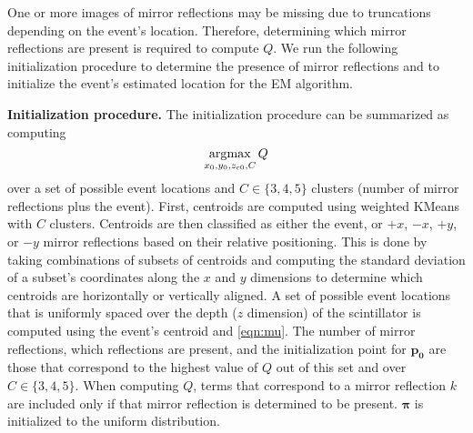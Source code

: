 One or more images of mirror reflections may be missing due to truncations 
depending on the event's location.
Therefore, determining which mirror reflections are present is required to compute $Q$.
We run the following initialization procedure to determine the presence of mirror 
reflections and to initialize the event's estimated location for the EM algorithm.

\noindent
\textbf{Initialization procedure.}
The initialization procedure can be summarized as computing 
\begin{equation}
\operatorname*{\arg\!\max}_{x_0,y_0,z_{c0},C} Q
\end{equation}
over a set of possible event locations and $C \in \{3,4,5\}$ clusters 
(number of mirror reflections plus the event).
First, centroids are computed using weighted KMeans with $C$ clusters.
Centroids are then classified as either the event, or $+x$, $-x$, $+y$, or $-y$ 
mirror reflections based on their relative positioning.
This is done by taking combinations of subsets of centroids and computing the 
standard deviation of a subset's coordinates along the $x$ and $y$ dimensions to 
determine which centroids are horizontally or vertically aligned.
A set of possible event locations that is uniformly spaced over the depth 
($z$ dimension) of the scintillator is computed using the event's centroid and \cref{eqn:mu}.
The number of mirror reflections, which reflections are present, and the 
initialization point for $\bm{p_0}$ are those that correspond to the 
highest value of $Q$ out of this set and over $C \in \{3, 4, 5\}$.
When computing $Q$, terms that correspond to a mirror reflection $k$ are included
only if that mirror reflection is determined to be present.
$\bm{\pi}$ is initialized to the uniform distribution.
\iffalse
This initialization procedure is described in \cref{alg:init}.
$\bm{\pi}$ is initialized to the uniform distribution.


\begin{algorithm}
\caption{\textbf{Initialization procedure.}} \label{alg:init}
\DontPrintSemicolon
\SetKwInOut{Parameter}{Arguments}
\SetKwFunction{KMeans}{KMeans}
\SetKwFunction{ClassifyCentroids}{ClassifyCentroids}
\SetKwFunction{PossibleEventLocations}{PossibleEventLocations}
\SetKwFunction{Q}{Q}
\SetKwComment{Comment}{// }{}
\Parameter{photon locations $\bm{t}$, photon weights $\bm{w}$, lens to sensor distance $S_2$}
\KwOut{event initialization location $\bm{p_{init}}$, number of mirror reflections $K_{out}$, mirror reflection classification $M_{out}$}
$Q_{max} = -\infty$\;
\For{K=3:5}{
  $\bm{\mu_k}^0 \leftarrow \KMeans(\bm{t}, \bm{w}, K)$\;
  $M \leftarrow \ClassifyCentroids(\bm{\mu_k}^0)$\;
  $S \leftarrow \PossibleEventLocations(\bm{\mu_{event}}^0, S_2)$ \Comment{\cref{eqn:mu}}
  \For{$\bm{\tilde{p_0}} \in S$}{
    $Q_{\bm{\tilde{p_0}}} \leftarrow \Q(\bm{\tilde{p_0}})$\;
    \If{$Q_{\bm{\tilde{p_0}}} > Q_{max}$}{
      $Q_{max} \leftarrow Q_{\bm{\tilde{p_0}}}$\;
      $\bm{p_{init}} \leftarrow \bm{\tilde{p_0}}$\;
      $M_{out} \leftarrow M$\;
      $K_{out} \leftarrow K-1$\;
    }
  }
}
\end{algorithm}
\fi

